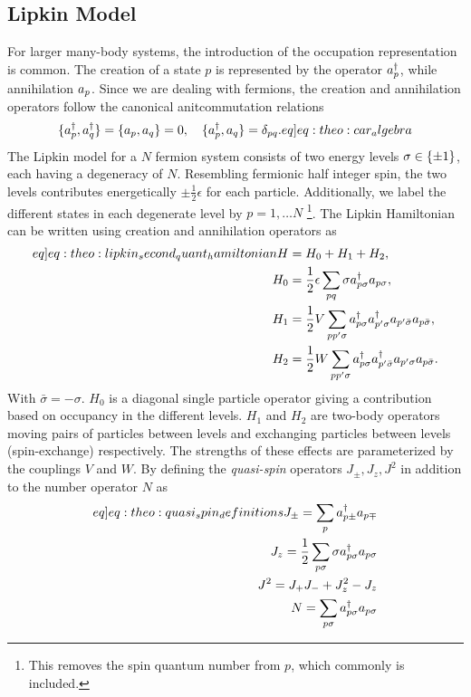 \subsection{Lipkin Model}
For larger many-body systems, the introduction of the occupation representation is common. The creation of a state $p$ is represented by the operator $a^{\dagger}_{p}$, while annihilation $a_{p}$. Since we are dealing with fermions, the creation and annihilation operators follow the canonical anitcommutation relations
\begin{align}
    \set{\crt{p},\crt{q}} = \set{\ani{p},\ani{q}} = 0, \hspace{10px}\set{\crt{p},\ani{q}} = \delta_{pq}. 
    \label[eq]{eq:theo:car_algebra}
\end{align}
The Lipkin model \citep{lipkinValidityManybodyApproximation1965} for a $N$ fermion system consists of two energy levels $\sigma \in \{\pm 1\}$, each having a degeneracy of $N$. Resembling fermionic half integer spin, the two levels contributes energetically $\pm \frac{1}{2}\epsilon$ for each particle. Additionally, we label the different states in each degenerate level by $p = 1, \ldots N$ \footnote{This removes the spin quantum number from $p$, which commonly is included.}. The Lipkin Hamiltonian can be written using creation and annihilation operators as 
\begin{align}
    \begin{split}\label[eq]{eq:theo:lipkin_second_quant_hamiltonian}
    H &= H_0 + H_1 + H_2, \\
    H_0 &= \frac{1}{2}\epsilon \sum_{pq} \sigma \crt{p\sigma} \ani{p\sigma}, \\
    H_1 &= \frac{1}{2}V \sum_{pp'\sigma} \crt{p\sigma}\crt{p'\sigma}\ani{p'\bar{\sigma}}\ani{p\bar{\sigma}}, \\
    H_2 &= \frac{1}{2}W \sum_{pp'\sigma} \crt{p\sigma} \crt{p'\bar{\sigma}} \ani{p'\sigma} \ani{p\bar{\sigma}}.
    \end{split}
\end{align}
With $\bar{\sigma} = -\sigma$. $H_0$ is a diagonal single particle operator giving a contribution based on occupancy in the different levels. $H_1$ and $H_2$ are two-body operators moving pairs of particles between levels and exchanging particles between levels (spin-exchange) respectively. The strengths of these effects are parameterized by the couplings $V$ and $W$. By defining the \textit{quasi-spin} operators $J_\pm , J_z, J^2$ in addition to the number operator $N$ as 
\begin{align}
    \begin{split}\label[eq]{eq:theo:quasi_spin_definitions}
        J_\pm = \sum_p \crt{p\pm}\ani{p\mp} \\
        J_z = \frac{1}{2}\sum_{p\sigma} \sigma \crt{p\sigma} \ani{p\sigma} \\
        J^2 = J_+ J_- + J_z^2 - J_z \\
        N = \sum_{p\sigma} \crt{p\sigma} \ani{p\sigma}
    \end{split}
\end{align}
